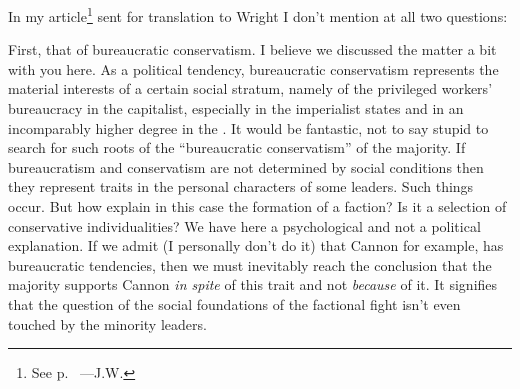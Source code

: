

In my article\footnote{See p.~\pageref{1940-01-07_an-open-letter-to-comrade-burnham} ---J.W.} sent for translation to Wright I don’t mention at all two questions:

First, that of bureaucratic conservatism. I believe we discussed the matter a bit with you here. As a political tendency, bureaucratic conservatism represents the material interests of a certain social stratum, namely of the privileged workers’ bureaucracy in the capitalist, especially in the imperialist states and in an incomparably higher degree in the \USSR. It would be fantastic, not to say stupid to search for such roots of the “bureaucratic conservatism” of the majority. If bureaucratism and conservatism are not determined by social conditions then they represent traits in the personal characters of some leaders. Such things occur. But how explain in this case the formation of a faction? Is it a selection of conservative individualities? We have here a psychological and not a political explanation. If we admit (I personally don’t do it) that Cannon for example, has bureaucratic tendencies, then we must inevitably reach the conclusion that the majority supports Cannon \emph{in spite} of this trait and not \emph{because} of it. It signifies that the question of the social foundations of the factional fight isn’t even touched by the minority leaders.

